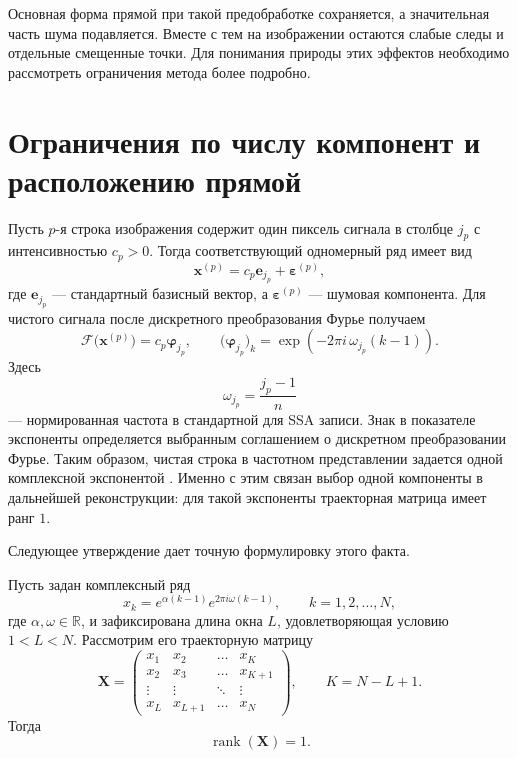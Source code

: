 Основная форма прямой при такой предобработке сохраняется, а значительная часть шума подавляется. Вместе с тем на изображении остаются слабые следы и отдельные смещенные точки. Для понимания природы этих эффектов необходимо рассмотреть ограничения метода более подробно.

\section{Ограничения по числу компонент и расположению прямой}

Пусть $p$-я строка изображения содержит один пиксель сигнала в столбце $j_p$ с интенсивностью $c_p>0$. Тогда соответствующий одномерный ряд имеет вид
\[
\mathbf{x}^{(p)} = c_p \mathbf{e}_{j_p} + \boldsymbol{\varepsilon}^{(p)},
\]
где $\mathbf{e}_{j_p}$ --- стандартный базисный вектор, а $\boldsymbol{\varepsilon}^{(p)}$ --- шумовая компонента. Для чистого сигнала после дискретного преобразования Фурье получаем
\[
\mathcal{F}\bigl(\mathbf{x}^{(p)}\bigr)
=
c_p \boldsymbol{\varphi}_{j_p},
\qquad
\bigl(\boldsymbol{\varphi}_{j_p}\bigr)_k
=
\exp\!\left(
-2\pi i\,\omega_{j_p}(k-1)
\right).
\]
Здесь
\[
\omega_{j_p}=\frac{j_p-1}{n}
\]
--- нормированная частота в стандартной для SSA записи. Знак в показателе
экспоненты определяется выбранным соглашением о дискретном преобразовании
Фурье.
Таким образом, чистая строка в частотном представлении задается одной комплексной экспонентой \cite{trickett2003,zhornikova2016}. Именно с этим связан выбор одной компоненты в дальнейшей реконструкции: для такой экспоненты траекторная матрица имеет ранг $1$.

Следующее утверждение дает точную формулировку этого факта.

\begin{statement}
Пусть задан комплексный ряд
\[
x_k = e^{\alpha(k-1)} e^{2\pi i\omega(k-1)}, \qquad k=1,2,\dots,N,
\]
где $\alpha,\omega \in \mathbb{R}$, и зафиксирована длина окна $L$,
удовлетворяющая условию $1<L<N$. Рассмотрим его траекторную матрицу
\[
\mathbf{X}=
\begin{pmatrix}
x_1 & x_2 & \dots & x_K\\
x_2 & x_3 & \dots & x_{K+1}\\
\vdots & \vdots & \ddots & \vdots\\
x_L & x_{L+1} & \dots & x_N
\end{pmatrix},
\qquad K=N-L+1.
\]
Тогда
\[
\operatorname{rank}(\mathbf{X})=1.
\]
\end{statement}

